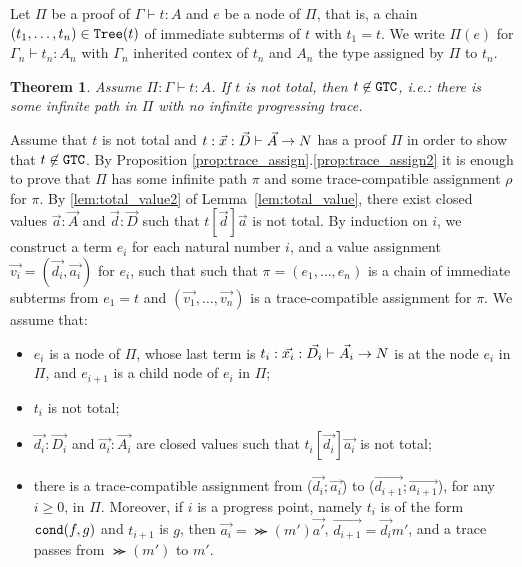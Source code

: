 \documentclass{article}
\newtheorem{theorem}{Theorem}[section]
\newenvironment{proof}[1][Proof]{\begin{trivlist}
\item[\hskip \labelsep {\bfseries #1}]}{\end{trivlist}}
\begin{document}

Let $\Pi$ be a proof of $\Gamma\vdash t:A$ and $e$ be a node of $\Pi$, that is, a chain  
$(t_1, \ldots, t_n) \in {\tt Tree}(t)$ of immediate
subterms of $t$ with $t_1 = t$.
We write $\Pi(e)$ for $\Gamma_n\vdash t_n:A_n$ with $\Gamma_n$ inherited contex of 
$t_n$ and $A_n$ the type assigned by $\Pi$ to $t_n$.

\begin{theorem}
  Assume $\Pi:\Gamma\vdash t:A$.
  If $t$ is \emph{not} total, then $t \not \in {\tt GTC}$, i.e.:
  there is some infinite path in $\Pi$ with no infinite progressing trace. 
\end{theorem}


\begin{proof}
  Assume that $t$ is not total
  and $t: \vec{x}:\vec{D}\vdash\vec{A}\rightarrow{N}$ 
  has a proof $\Pi$ in order to show that $t \not \in {\tt GTC}$.
  By Proposition \ref{prop:trace_assign}.\ref{prop:trace_assign2} it is enough to prove that
  $\Pi$ has some infinite path $\pi$ and some trace-compatible assignment $\rho$ for $\pi$.
  By \ref{lem:total_value2} of Lemma~\ref{lem:total_value},
  there exist closed values $\vec{a}:\vec{A}$ and $\vec{d}:\vec{D}$ such that
  $t[\vec{d}]\vec{a}$ is not total. 
  By induction on $i$, we construct a term $e_i$ for each natural number $i$,
  and a value assignment $\vec{v_i} = (\vec{d_i},\vec{a_i})$ for $e_i$, such that 
  such that $\pi=(e_1, \ldots, e_n)$ is a chain of immediate subterms from $e_1  = t$
  and $(\vec{v_1},\ldots,\vec{v_n})$ is a trace-compatible assignment for $\pi$.
  We assume that:
  \begin{itemize}
  \item[(i)]
    $e_i$ is a node of $\Pi$, whose last term is 
    $t_i: \vec{x_i}:\vec{D_i}\vdash\vec{A_i}\rightarrow{N}$ is
    at the node $e_i$ in $\Pi$, and $e_{i+1}$ is a child node of $e_i$ in $\Pi$; 
  \item[(ii)]
    $t_i$ is not total;
  \item[(iii)]
    $\vec{d_i}:\vec{D_i}$ and $\vec{a_i}:\vec{A_i}$ are closed values
    such that $t_i[\vec{d_i}]\vec{a_i}$ is not total;
  \item[(iv)]
    there is a trace-compatible assignment from
    ($\vec{d_i};\vec{a_i}$) to ($\vec{d_{i+1}};\vec{a_{i+1}}$), for any $i\ge 0$, in $\Pi$.
    Moreover, if $i$ is a progress point, namely $t_i$ is of the form ${\tt cond}(f,g)$ and $t_{i+1}$ is $g$,
    then $\vec{a_i} = \Succ(m')\vec{a'}$, $\vec{d_{i+1}} = \vec{d_i}m'$, and
    a trace passes from $\Succ(m')$ to $m'$. 
  \end{itemize}
  

\end{proof}
\end{document}
